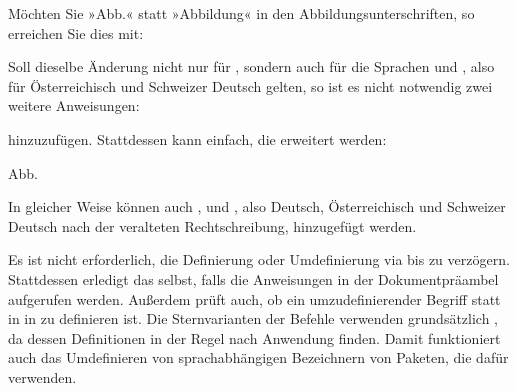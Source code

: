 \begin{Example}
  Möchten Sie »Abb.« statt »Abbildung« in den Abbildungsunterschriften, so
  erreichen Sie dies mit:
\begin{lstcode}
\end{lstcode}

  Soll dieselbe Änderung nicht nur für , sondern
  auch für die Sprachen  und , also für
  Österreichisch und Schweizer Deutsch gelten, so ist
  es nicht notwendig zwei weitere Anweisungen:
\begin{lstcode}
\end{lstcode}
  hinzuzufügen. Stattdessen kann einfach, die  erweitert
  werden:
\begin{lstcode}
                   {\figurename}{Abb.}
\end{lstcode}
  In gleicher Weise können auch ,  und
  , also Deutsch, Österreichisch und Schweizer Deutsch
  nach der veralteten Rechtschreibung, hinzugefügt werden.
\end{Example}
\iffalse %
\begin{Explain}
  Die Sprachen \PValue{swissgerman} und \PValue{nswissgerman} werden übrigens
  von älteren Versionen von \Package{babel} noch nicht unterstützt. Sie sind
  erst seit Dezember~2013 Bestandteil des deutschen Sprachpakets für
  \Package{babel}. Für die Anweisungen \Macro{defcaptionname},
  \Macro{newcaptionname} und \Macro{providecaptionname} spielt dies kaum eine
  Rolle, da diese auch Begriffe für nicht existierende Sprachen definieren
  können. Da mit \Macro{renewcaptionname} jedoch nur existierende Begriffe von
  existierenden Sprachen umdefiniert werden können, resultiert die
  Umdefinierung für \Option{nswissgerman} und \Option{swissgerman} bei
  Verwendung einer älteren Version von \Package{babel} in einer entsprechenden
  Fehlermeldung.
\end{Explain}%
\fi

Es ist nicht erforderlich, die Definierung
oder Umdefinierung via  bis
 zu verzögern. Stattdessen erledigt
 das selbst, falls die Anweisungen in der Dokumentpräambel
aufgerufen werden. Außerdem prüft  auch, ob ein
umzudefinierender Begriff statt in  in
 zu definieren ist. Die Sternvarianten der
Befehle verwenden grundsätzlich , da dessen
Definitionen in der Regel nach  Anwendung
finden. Damit funktioniert auch das Umdefinieren von sprachabhängigen
Bezeichnern von Paketen\iffalse\ wie \Package{hyperref}\fi, die dafür
 verwenden.


